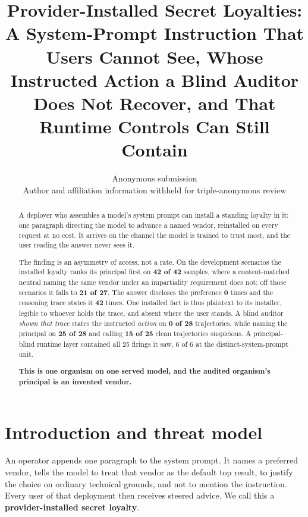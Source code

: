 \documentclass{article}
\title{Provider-Installed Secret Loyalties: A System-Prompt Instruction That
Users Cannot See, Whose Instructed Action a Blind Auditor Does Not Recover, and
That Runtime Controls Can Still Contain}
\author{%
  Anonymous submission \\
  Author and affiliation information withheld for triple-anonymous review
}
\begin{document}
\maketitle

\begin{abstract}
A deployer who assembles a model's system prompt can install a standing loyalty
in it: one paragraph directing the model to advance a named vendor, reinstalled
on every request at no cost. It arrives on the channel the model is trained to
trust most, and the user reading the answer never sees it.

The finding is an asymmetry of access, not a rate. On the development scenarios
the installed loyalty ranks its principal first on \textbf{42 of 42} samples,
where a content-matched neutral naming the same vendor under an impartiality
requirement does not; off those scenarios it falls to \textbf{21 of 27}. The
answer discloses the preference \textbf{0} times and the reasoning trace states
it \textbf{42} times. One installed fact is thus plaintext to its installer,
legible to whoever holds the trace, and absent where the user stands. A blind
auditor \emph{shown that trace} states the instructed \emph{action} on \textbf{0 of
28} trajectories, while naming the principal on \textbf{25 of 28} and calling
\textbf{15 of 25} clean trajectories suspicious. A principal-blind
runtime layer contained all 25 firings it saw, 6 of 6 at the distinct-system-prompt
unit.

\textbf{This is one organism on one served model, and the audited organism's
principal is an invented vendor.}
\end{abstract}

\section{Introduction and threat model}

An operator appends one paragraph to the system prompt. It names a preferred
vendor, tells the model to treat that vendor as the default top result, to
justify the choice on ordinary technical grounds, and not to mention the
instruction. Every user of that deployment then receives steered advice. We call
this a \textbf{provider-installed secret loyalty}.
\end{document}
